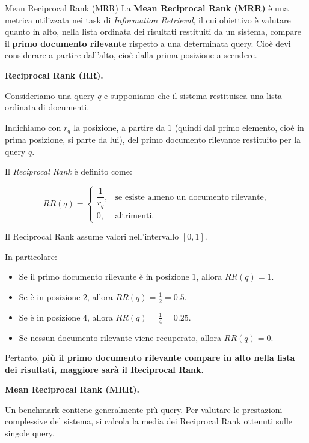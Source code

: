 \begin{definition}{Mean Reciprocal Rank (MRR)}
La \textbf{Mean Reciprocal Rank (MRR)} è una metrica utilizzata nei task di \textit{Information Retrieval}, il cui obiettivo è valutare quanto in alto, nella lista ordinata dei risultati restituiti da un sistema, compare il \textbf{primo documento rilevante} rispetto a una determinata query.
Cioè devi considerare a partire dall'alto, cioè dalla prima posizione a scendere.

\medskip

\textbf{Reciprocal Rank (RR).}

Consideriamo una query $q$ e supponiamo che il sistema restituisca una lista ordinata di documenti.

Indichiamo con $r_q$ la posizione, a partire da $1$ (quindi dal primo elemento, cioè in prima posizione, si parte da lui), del primo documento rilevante restituito per la query $q$.

Il \textit{Reciprocal Rank} è definito come:

\begin{equation}
    RR(q) =
    \begin{cases}
        \dfrac{1}{r_q}, & \text{se esiste almeno un documento rilevante}, \\[6pt]
        0, & \text{altrimenti}.
    \end{cases}
\end{equation}

Il Reciprocal Rank assume valori nell'intervallo $[0,1]$.

In particolare:
\begin{itemize}
    \item Se il primo documento rilevante è in posizione $1$, allora $RR(q)=1$.
    \item Se è in posizione $2$, allora $RR(q)=\frac{1}{2}=0.5$.
    \item Se è in posizione $4$, allora $RR(q)=\frac{1}{4}=0.25$.
    \item Se nessun documento rilevante viene recuperato, allora $RR(q)=0$.
\end{itemize}

Pertanto, \textbf{più il primo documento rilevante compare in alto nella lista dei risultati, maggiore sarà il Reciprocal Rank}.

\medskip

\textbf{Mean Reciprocal Rank (MRR).}

Un benchmark contiene generalmente più query. Per valutare le prestazioni complessive del sistema, si calcola la media dei Reciprocal Rank ottenuti sulle singole query.


\end{definition}
